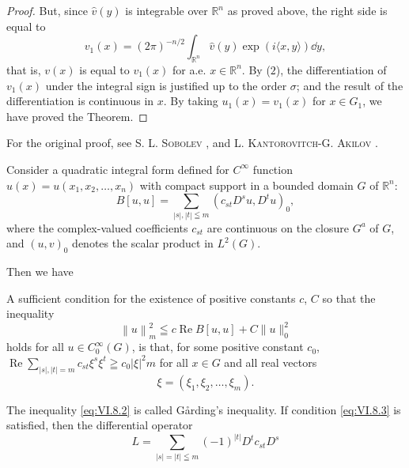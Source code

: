 \begin{proof}
But, since $\hat{v}(y)$ is integrable over $\mathbb{R}^{n}$ as proved above, the right side is equal to 
\[
v _{1} (x) = (2 \pi) ^{-n/2} \int_ {\mathbb{R}^{n}} \hat {v} (y) \exp (i \langle x, y \rangle) \dd y,
\]
that is, $v(x)$ is equal to $v_{1}(x)$ for a.e. $x \in \mathbb{R}^{n}$. By ($2$), the differentiation of $v_{1}(x)$ under the integral sign is justified up to the order $\sigma$; and the result of the differentiation is continuous in $x$. By taking $u_{1}(x) = v_{1}(x)$ for $x \in G_{1}$, we have proved the Theorem. 
\end{proof}

\begin{remarku} For the original proof, see S. L. \textsc{Sobolev} \cite{sobolev306}, \cite{sobolev307} and L. \textsc{Kantorovitch}-G. \textsc{Akilov} \cite{kantorovitch133}. 
\end{remarku}


\label{sec:VI.8}

Consider a quadratic integral form defined for $C^\infty$ function $u(x) = u(x_1, x_2, \ldots, x_n)$ with compact support in a bounded domain $G$ of $\mathbb{R}^{n}$: 
\begin{equation}\label{eq:VI.8.1}
B [ u, u ] = \sum\limits_{| s |, | t | \leqq m} (c _{st} D ^{s} u, D ^{t} u) _{0},
\end{equation}
where the complex-valued coefficients $c_{st}$ are continuous on the closure $G^{a}$ of $G$, and $(u,v)_{0}$ denotes the scalar product in $L^{2}(G)$. 

Then we have 

\begin{theoremn} A sufficient condition for the existence of positive constants $c$, $C$ so that the inequality
\begin{equation}\label{eq:VI.8.2}
\left\| u \right\| _{m} ^{2} \leqq c \operatorname{Re} B [ u, u ] + C \| u \| _{0} ^{2}
\end{equation}
holds for all $u \in C_0^\infty(G)$, is that, for some positive constant $c_0$, 
$\operatorname{Re} \sum\limits_{|s|,|t|=m} c_{st} \xi^s \xi^t \geqq c_0 |\xi|^2m$ for all $x \in G$ and all real vectors 
\begin{equation}\label{eq:VI.8.3}
\xi = (\xi_{1}, \xi_{2}, \dots , \xi_{m}).
\end{equation}

\end{theoremn}
\begin{remarku} The inequality \eqref{eq:VI.8.2} is called Gårding's inequality. If condition \eqref{eq:VI.8.3} is satisfied, then the differential operator 
\begin{equation}\label{eq:VI.8.4}
L = \sum\limits_{| s | = | t | \leqq m} (- 1) ^{|t|} D ^{t} c _{st} D ^{s}
\end{equation}
\end{remarku}

